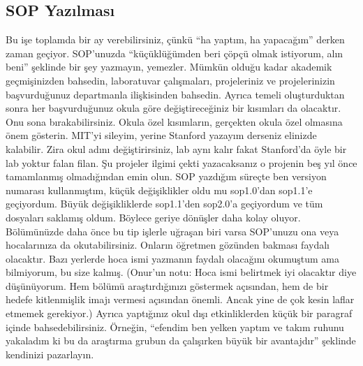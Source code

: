 \documentclass[12pt]{article}
\theoremstyle{break}
\begin{document}
\subsection{SOP Yazılması}
Bu işe toplamda bir ay verebilirsiniz, çünkü “ha yaptım, ha yapacağım” derken zaman geçiyor. SOP’unuzda “küçüklüğümden beri çöpçü olmak istiyorum, alın beni” şeklinde bir şey yazmayın, yemezler. Mümkün olduğu kadar akademik geçmişinizden bahsedin, laboratuvar çalışmaları, projeleriniz ve projelerinizin başvurduğunuz departmanla ilişkisinden bahsedin. Ayrıca temeli oluşturduktan sonra her başvurduğunuz okula göre değiştireceğiniz bir kısımları da olacaktır. Onu sona bırakabilirsiniz. Okula özel kısımların, gerçekten okula özel olmasına önem gösterin. MIT’yi sileyim, yerine Stanford yazayım derseniz elinizde kalabilir. Zira okul adını değiştirirsiniz, lab aynı kalır fakat Stanford’da öyle bir lab yoktur falan filan. Şu projeler ilgimi çekti yazacaksanız o projenin beş yıl önce tamamlanmış olmadığından emin olun. SOP yazdığım süreçte ben versiyon numarası kullanmıştım, küçük değişiklikler oldu mu sop1.0’dan sop1.1’e geçiyordum. Büyük değişikliklerde sop1.1’den sop2.0’a geçiyordum ve tüm dosyaları saklamış oldum. Böylece geriye dönüşler daha kolay oluyor. Bölümünüzde daha önce bu tip işlerle uğraşan biri varsa SOP’unuzu ona veya hocalarınıza da okutabilirsiniz. Onların öğretmen gözünden bakması faydalı olacaktır. Bazı yerlerde hoca ismi yazmanın faydalı olacağını okumuştum ama bilmiyorum, bu size kalmış. (Onur’un notu: Hoca ismi belirtmek iyi olacaktır diye düşünüyorum. Hem bölümü araştırdığınızı göstermek açısından, hem de bir hedefe kitlenmişlik imajı vermesi açısından önemli. Ancak yine de çok kesin laflar etmemek gerekiyor.) Ayrıca yaptığınız okul dışı etkinliklerden küçük bir paragraf içinde bahsedebilirsiniz. Örneğin, “efendim ben yelken yaptım ve takım ruhunu yakaladım ki bu da araştırma grubun da çalışırken büyük bir avantajdır” şeklinde kendinizi pazarlayın.
\end{document}
